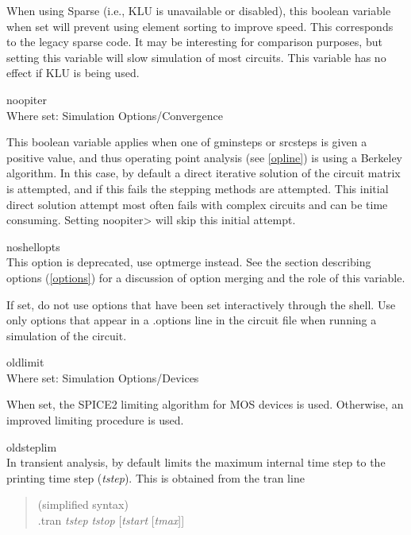\begin{description}
When using Sparse (i.e., KLU is unavailable or disabled), this
boolean variable when set will prevent using element sorting to
improve speed.  This corresponds to the legacy {\WRspice}
sparse code.  It may be interesting for comparison purposes, but
setting this variable will slow simulation of most circuits.
This variable has no effect if KLU is being used.

\item{\et noopiter}\\
Where set: {\cb Simulation Options/Convergence}

This boolean variable applies when one of {\et gminsteps} or {\et
srcsteps} is given a positive value, and thus operating point analysis
(see \ref{opline}) is using a Berkeley algorithm.  In this case, by
default a direct iterative solution of the circuit matrix is
attempted, and if this fails the stepping methods are attempted.  This
initial direct solution attempt most often fails with complex circuits
and can be time consuming.  Setting {\et noopiter}> will skip this
initial attempt.

\item{\et noshellopts}\\
This option is deprecated, use {\et optmerge} instead.  See the
section describing options (\ref{options}) for a discussion of option
merging and the role of this variable.

If set, do not use {\WRspice} options that have been set interactively
through the shell.  Use only options that appear in a {\vt .options}
line in the circuit file when running a simulation of the circuit.

\item{\et oldlimit}\\
Where set: {\cb Simulation Options/Devices}

When set, the SPICE2 limiting algorithm for MOS devices is used. 
Otherwise, an improved limiting procedure is used.

\item{\et oldsteplim}\\
In transient analysis, {\WRspice} by default limits the maximum
internal time step to the printing time step ({\it tstep\/}).  This is
obtained from the {\vt tran} line

\begin{quote}
(simplified syntax)\\
{\vt .tran} {\it tstep} {\it tstop} [{\it tstart} [{\it tmax\/}]]
\end{quote}


\end{description}
